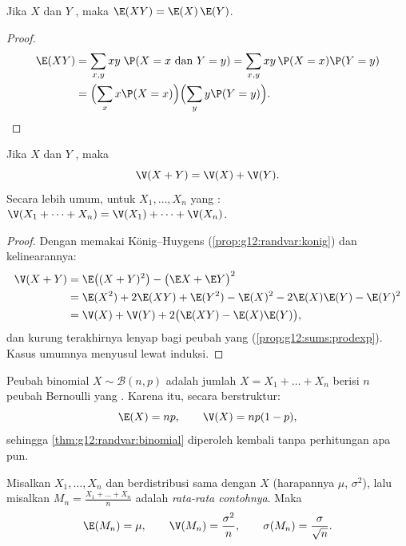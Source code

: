\begin{proposition}\label{prop:g12:sums:prodexp}
Jika $X$ dan $Y$ , maka $\E(XY) = \E(X)\,\E(Y)$.
\end{proposition}

\begin{proof}
\[
\begin{aligned}
\E(XY) &= \sum_{x, y} xy\;\P(X = x \text{ dan } Y = y)
= \sum_{x, y} xy\,\P(X=x)\P(Y=y) \\
&= \Bigl(\sum_x x\P(X=x)\Bigr)\Bigl(\sum_y y\P(Y=y)\Bigr). \qedhere
\end{aligned}
\]
\end{proof}

\begin{theorem}\label{thm:g12:sums:variance}
Jika $X$ dan $Y$ \emph{}, maka
\[
\V(X + Y) = \V(X) + \V(Y).
\]
Secara lebih umum, untuk $X_1, \dots, X_n$ yang :
$\V(X_1 + \dots + X_n) = \V(X_1) + \dots + \V(X_n)$.
\end{theorem}

\begin{proof}
Dengan memakai König--Huygens (\cref{prop:g12:randvar:konig}) dan kelinearannya:
\begin{align*}
\V(X + Y) &= \E\bigl((X+Y)^2\bigr) - \bigl(\E X + \E Y\bigr)^2\\
&= \E(X^2) + 2\E(XY) + \E(Y^2)
- \E(X)^2 - 2\E(X)\E(Y) - \E(Y)^2\\
&= \V(X) + \V(Y) + 2\bigl(\E(XY) - \E(X)\E(Y)\bigr),
\end{align*}
dan kurung terakhirnya lenyap bagi peubah yang 
(\cref{prop:g12:sums:prodexp}). Kasus umumnya menyusul lewat induksi.
\end{proof}

\begin{example}\label{ex:g12:sums:binomial}
Peubah binomial $X \sim \mathcal B(n, p)$ adalah jumlah
$X = X_1 + \dots + X_n$ berisi $n$ peubah Bernoulli yang . Karena itu,
secara berstruktur:
\[
\E(X) = np, \qquad \V(X) = np(1-p),
\]
sehingga \cref{thm:g12:randvar:binomial} diperoleh kembali tanpa perhitungan apa pun.
\end{example}

\begin{proposition}\label{prop:g12:sums:mean}
Misalkan $X_1, \dots, X_n$  dan berdistribusi sama dengan $X$
(harapannya $\mu$,  $\sigma^2$), lalu misalkan
$M_n = \frac{X_1 + \dots + X_n}{n}$ adalah \emph{rata-rata
contohnya}. Maka
\[
\E(M_n) = \mu, \qquad \V(M_n) = \frac{\sigma^2}{n}, \qquad
\sigma(M_n) = \frac{\sigma}{\sqrt n}.
\]
\end{proposition}


